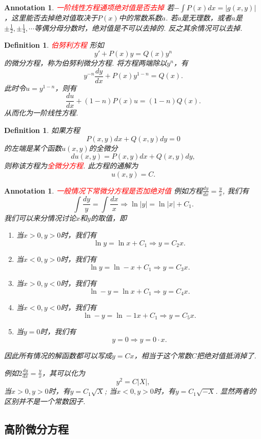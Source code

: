 \documentclass{article}
\newtheorem{definition}[theorem]{Definition}
\newtheorem{annotation}[theorem]{Annotation}
\newcommand{\redt}[1]{\textcolor{red}{#1}}
\begin{document}
\begin{annotation}
\rm \redt{一阶线性方程通项绝对值是否去掉} 若$-\int P(x)dx = |g(x,y)|$，这里能否去掉绝对值取决于$P(x)$中的常数系数$a$. 若$a$是无理数，或者$a$是$\pm \frac{1}{2},\pm \frac{1}{4},\cdots$等偶分母分数时，绝对值是不可以去掉的. 反之其余情况可以去掉. 
\end{annotation}


\begin{definition}
\rm \redt{伯努利方程} 形如
$$
y' +P(x)y=Q(x)y^n
$$
的微分方程，称为伯努利微分方程. 将方程两端除以$y^n$，有
$$
y^{-n} \frac{dy}{dx} + P(x)y^{1-n} = Q(x).
$$
此时令$u = y^{1-n}$，则有
$$
\frac{du}{dx} + (1-n)P(x)u = (1-n)Q(x).
$$
从而化为一阶线性方程. 
\end{definition}

\begin{definition}
\rm 如果方程
$$
P(x,y)dx + Q(x,y)dy = 0
$$
的左端是某个函数$u(x,y)$的全微分
$$
du(x,y) = P(x,y)dx + Q(x,y)dy,
$$
则称该方程为\redt{全微分方程}. 此方程的通解为
$$
u(x,y) = C. 
$$
\end{definition}

\begin{annotation}
\rm \redt{一般情况下常微分方程是否加绝对值} 例如方程$\frac{dy}{dx} = \frac{y}{x}$, 我们有
$$
\int \frac{dy}{y} = \int \frac{dx}{x} \Rightarrow \ln |y| = \ln |x| + C_1. 
$$
我们可以来分情况讨论$x$和$y$的取值，即
\begin{enumerate}
	\item 当$x > 0, y > 0$时，我们有
	$$
	\ln y = \ln x + C_1 \Rightarrow y = C_2 x.
	$$
	\item 当$x < 0, y > 0$时，我们有
	$$
	\ln y = \ln -x + C_1 \Rightarrow y = C_3 x.
	$$
	\item 当$x > 0 , y < 0$时，我们有
	$$
	\ln -y = \ln x + C_1 \Rightarrow y= C_4 x.
	$$
	\item 当$x < 0, y < 0$时，我们有
	$$
	\ln -y = \ln -1x + C_1 \Rightarrow y = C_5 x.
	$$
	\item 当$y = 0$时，我们有
	$$
	y = 0 \Rightarrow y = 0 \cdot x.
	$$
\end{enumerate}
因此所有情况的解函数都可以写成$y = Cx$，相当于这个常数$C$把绝对值抵消掉了. 

例如$2\frac{dy}{dx} = \frac{y}{x}$，其可以化为
$$
y^2 = C|X|,
$$
当$x > 0, y > 0$时，有$y = C_1\sqrt{X}$; 当$x < 0, y >0$时，有$y=C_1\sqrt{-X}$. 显然两者的区别并不是一个常数因子. 
\end{annotation}

\subsection{高阶微分方程}
\end{document}
